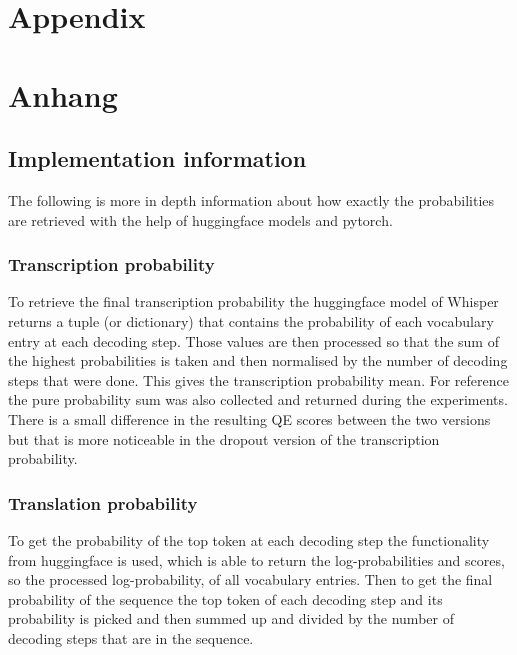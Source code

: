 
{\chapter{Appendix}}    %
{\chapter{Anhang}}      %
\label{chap:appendix}
\section{Implementation information}\label{ch:implementation information}
The following is more in depth information about how exactly the probabilities are retrieved with the help of huggingface models and pytorch. 
\subsection{Transcription probability}
To retrieve the final transcription probability the huggingface model of Whisper returns a tuple (or dictionary) that contains the probability of each vocabulary entry at each decoding step.
Those values are then processed so that the sum of the highest probabilities is taken and then normalised by the number of decoding steps that were done. This gives the transcription probability mean. For reference the pure probability sum was also collected and returned during the experiments. 
There is a small difference in the resulting QE scores between the two versions but that is more noticeable in the dropout version of the transcription probability.

\subsection{Translation probability}
To get the probability of the top token at each decoding step the functionality from huggingface is used, which is able to return the log-probabilities and scores, so the processed log-probability, of all vocabulary entries. 
Then to get the final probability of the sequence the top token of each decoding step and its probability is picked and then summed up and divided by the number of decoding steps that are in the sequence.


